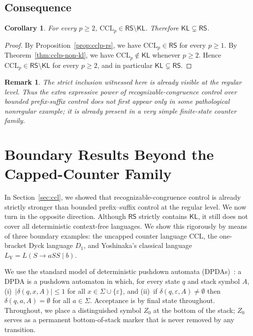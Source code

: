 \documentclass[11pt,a4paper]{article}
\newtheorem{corollary}[theorem]{Corollary}
\newtheorem{remark}[theorem]{Remark}
\begin{document}
\subsection{Consequence}

\begin{corollary}\label{cor:ccl-family-witness}
For every $p\ge2$, $\mathrm{CCL}_p\in\mathsf{RS}\setminus\mathsf{KL}$. Therefore $\mathsf{KL}\subsetneq\mathsf{RS}$.
\end{corollary}

\begin{proof}
By Proposition~\ref{prop:cclp-rs}, we have $\mathrm{CCL}_p\in\mathsf{RS}$ for every $p\ge1$. By Theorem~\ref{thm:cclp-non-kl}, we have $\mathrm{CCL}_p\notin\mathsf{KL}$ whenever $p\ge2$. Hence $\mathrm{CCL}_p\in\mathsf{RS}\setminus\mathsf{KL}$ for every $p\ge2$, and in particular $\mathsf{KL}\subsetneq\mathsf{RS}$.
\end{proof}

\begin{remark}
The strict inclusion witnessed here is already visible at the regular level. Thus the extra expressive power of recognizable-congruence control over bounded prefix-suffix control does not first appear only in some pathological nonregular example; it is already present in a very simple finite-state counter family.
\end{remark}

\section{Boundary Results Beyond the Capped-Counter Family}
\label{sec:non-sub}

In Section~\ref{sec:ccl}, we showed that recognizable-congruence control is already strictly stronger than bounded prefix--suffix control at the regular level. We now turn in the opposite direction. Although $\mathsf{RS}$ strictly contains $\mathsf{KL}$, it still does not cover all deterministic context-free languages. We show this rigorously by means of three boundary examples: the uncapped counter language $\mathrm{CCL}$, the one-bracket Dyck language $D_1$, and Yoshinaka's classical language $L_{\mathrm{Y}}=L(S\to aSS\mid b)$.

We use the standard model of deterministic pushdown automata (DPDAs)~\cite{HopcroftMotwaniUllman2006}: a DPDA is a pushdown automaton in which, for every state $q$ and stack symbol $A$, (i)~$|\delta(q,x,A)|\le 1$ for all $x\in\Sigma\cup\{\varepsilon\}$, and (ii)~if $\delta(q,\varepsilon,A)\ne\emptyset$ then $\delta(q,a,A)=\emptyset$ for all $a\in\Sigma$. Acceptance is by final state throughout. Throughout, we place a distinguished symbol $Z_0$ at the bottom of the stack; $Z_0$ serves as a permanent bottom-of-stack marker that is never removed by any transition.
\end{document}
